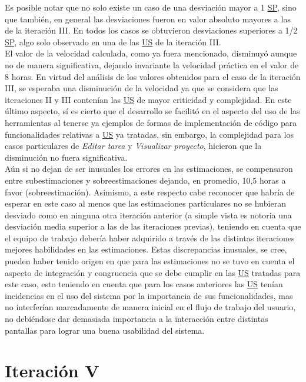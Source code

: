 \documentclass[a4paper, 12pt,twoside]{report}  %
\numberwithin{equation}{subsection} %
\begin{document}
\indent Es posible notar que no solo existe un caso de una desviación mayor a 1 \hyperlink{SP}{SP}, sino que también, en general las desviaciones fueron en valor absoluto mayores a las de la iteración III. En todos los casos se obtuvieron desviaciones superiores a 1/2 \hyperlink{SP}{SP}, algo solo observado en una de las \hyperlink{US}{US} de la iteración III.\\
\indent El valor de la velocidad calculada, como ya fuera mencionado, disminuyó aunque no de manera significativa, dejando invariante la velocidad práctica en el valor de 8 horas. En virtud del análisis de los valores obtenidos para el caso de la iteración III, se esperaba una disminución de la velocidad ya que se considera que las iteraciones II y III contenían las \hyperlink{US}{US} de mayor criticidad y complejidad. En este último aspecto, sí es cierto que el desarrollo se facilitó en el aspecto del uso de las herramientas al tenerse ya ejemplos de formas de implementación de código para funcionalidades relativas a \hyperlink{US}{US} ya tratadas, sin embargo, la complejidad para los casos particulares de \textit{Editar tarea} y \textit{Visualizar proyecto}, hicieron que la disminución no fuera significativa.\\
\indent Aún si no dejan de ser inusuales los errores en las estimaciones, se compensaron entre subestimaciones y sobreestimaciones dejando, en promedio, 10,5 horas a favor (sobreestimación). Asimismo, a este respecto cabe reconocer que habría de esperar en este caso al menos que las estimaciones particulares no se hubieran desviado como en ninguna otra iteración anterior (a simple vista es notoria una desviación media superior a las de las iteraciones previas), teniendo en cuenta que el equipo de trabajo debería haber adquirido a través de las distintas iteraciones mejores habilidades en las estimaciones. Estas discrepancias inusuales, se cree, pueden haber tenido origen en que para las estimaciones no se tuvo en cuenta el aspecto de integración y congruencia que se debe cumplir en las \hyperlink{US}{US} tratadas para este caso, esto teniendo en cuenta que para los casos anteriores las \hyperlink{US}{US} tenían incidencias en el uso del sistema por la importancia de sus funcionalidades, mas no interferían marcadamente de manera inicial en el flujo de trabajo del usuario, no debiéndose dar demasiada importancia a la interacción entre distintas pantallas para lograr una buena usabilidad del sistema.

\section{Iteración V}
\end{document}
